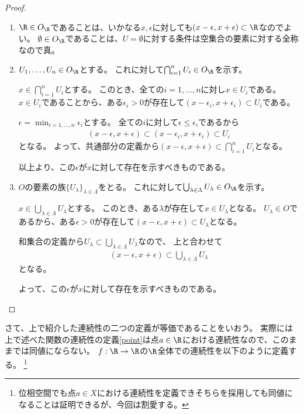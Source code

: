 \documentclass[uplatex]{jsarticle}
\begin{document}
\begin{proof}
  \begin{enumerate}
  \item $\R\in O_\R$であることは、いかなる$x,\epsilon$に対しても$(x-\epsilon,x+\epsilon)\subset\R$なのでよい。
    $\emptyset\in O_\R$であることは、$U=\emptyset$に対する条件は空集合の要素に対する全称なので真。
  \item $U_1,\ldots,U_n\in O_\R$とする。
    これに対して$\bigcap_{i=1}^nU_i\in O_\R$を示す。
    
    $x\in\bigcap_{i=1}^nU_i$とする。
    このとき、全ての$i=1,\ldots,n$に対し$x\in U_i$である。
    $x\in U_i$であることから、ある$\epsilon_i>0$が存在して$(x-\epsilon_i,x+\epsilon_i)\subset U_i$である。
    
    $\epsilon=\min_{i=1,\ldots,n}\epsilon_i$とする。
    全ての$i$に対して$\epsilon\leq \epsilon_i$であるから
    \begin{align*}
      (x-\epsilon,x+\epsilon)\subset(x-\epsilon_i,x+\epsilon_i)\subset U_i
    \end{align*}
    となる。
    よって、共通部分の定義から$(x-\epsilon,x+\epsilon)\subset\bigcap_{i=1}^nU_i$となる。

    以上より、この$\epsilon$が$x$に対して存在を示すべきものである。
  \item
    $O$の要素の族$\{U_\lambda\}_{\lambda\in\Lambda}$をとる。
    これに対して$\bigcup_{\lambda\in\Lambda}U_\lambda\in O_\R$を示す。
    
    $x\in\bigcup_{\lambda\in\Lambda}U_\lambda$とする。
    このとき、ある$\lambda$が存在して$x\in U_\lambda$となる。
    $U_\lambda\in O$であるから、ある$\epsilon>0$が存在して$(x-\epsilon,x+\epsilon)\subset U_\lambda$となる。
    
    和集合の定義から$U_\lambda\subset\bigcup_{\lambda\in\Lambda}U_\lambda$なので、
    上と合わせて
    \begin{align*}
      (x-\epsilon,x+\epsilon)\subset\bigcup_{\lambda\in\Lambda}U_\lambda
    \end{align*}
    となる。

    よって、この$\epsilon$が$x$に対して存在を示すべきものである。
  \end{enumerate}  
\end{proof}

さて、上で紹介した連続性の二つの定義が等価であることをいおう。
実際には上で述べた関数の連続性の定義\ref{point}は点$a\in\R$における連続性なので、このままでは同値にならない。
$f:\R\to\R$の$\R$全体での連続性を以下のように定義する。
\footnote{位相空間でも点$a\in X$における連続性を定義できそちらを採用しても同値になることは証明できるが、今回は割愛する。}
\end{document}

